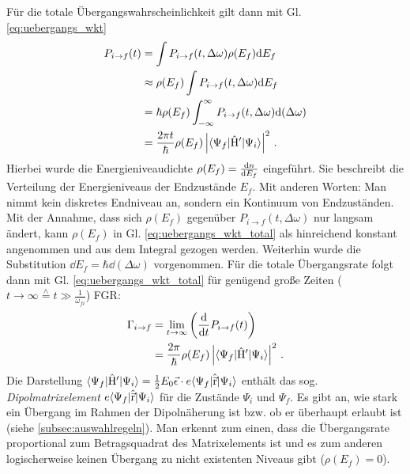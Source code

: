 Für die totale Übergangswahrscheinlichkeit gilt dann mit Gl.
\eqref{eq:uebergangs_wkt}
\begin{equation}\label{eq:uebergangs_wkt_total}
	\begin{split}
		P_{i\to f}(t)
		&= \int{P_{i\to f}(t,\Delta\omega)\rho(E_f)}\mathrm{d} E_f\\
		&\approx \rho(E_f)\int{P_{i\to f}(t,\Delta\omega)}\mathrm{d} E_f\\
		&= \hbar\rho(E_f)\int_{-\infty}^{\infty}{P_{i\to
		f}(t,\Delta\omega)}\mathrm{d}(\Delta\omega)\\
		&= \frac{2\pi t}{\hbar}\rho(E_f)\left|\langle{\Psi_f}|\hat{\mathrm{H}}'|{\Psi_i}\rangle\right|^2\,.
	\end{split}
\end{equation}
Hierbei wurde die Energieniveaudichte $\rho(E_f)=\frac{\mathrm{d} n}{\mathrm{d} E_f}$ eingeführt. Sie
beschreibt die Verteilung der Energieniveaus der Endzustände $E_f$. Mit anderen
Worten: Man nimmt kein diskretes Endniveau an, sondern ein Kontinuum
von Endzuständen. Mit der Annahme, dass sich $\rho(E_f)$ gegenüber $P_{i\to
f}(t,\Delta\omega)$ nur langsam ändert, kann $\rho(E_f)$ in Gl. \eqref{eq:uebergangs_wkt_total} als hinreichend konstant angenommen und aus dem Integral gezogen werden. Weiterhin wurde die Substitution $\dd E_f=\hbar\dd(\Delta\omega)$ vorgenommen. Für die
totale Übergangsrate folgt dann mit Gl. \eqref{eq:uebergangs_wkt_total}
für genügend große Zeiten ($t\to\infty\stackrel{\wedge}{=}
t\gg\frac{1}{\omega_{fi}}$) FGR:
\begin{equation}\label{eq:uebergangs_rate_total}
	\begin{split}
		\Gamma_{i\to f}
		&= \lim_{t\to\infty}{\left(\frac{\mathrm{d} }{\mathrm{d} t}{P_{i\to f}(t)}\right)}\\
		&= \frac{2\pi}{\hbar}\rho(E_f)\left|\langle{\Psi_f}|\hat{\mathrm{H}}'|{\Psi_i}\rangle\right|^2\,.
	\end{split}
\end{equation}
Die Darstellung $\langle{\Psi_f}|\hat{\mathrm{H}}'|{\Psi_i}\rangle =
\frac{1}{2}E_0\vec{\epsilon}\cdot e\langle{\Psi_f}|\hat{\vec{\mathrm{r}}}|{\Psi_i}\rangle$ enthält
das sog. \textit{Dipolmatrixelement} $e\langle{\Psi_f}|\hat{\vec{\mathrm{r}}}|{\Psi_i}\rangle$ für die Zustände
$\Psi_i$ und $\Psi_f$. Es gibt an, wie stark ein Übergang im Rahmen der
Dipolnäherung ist bzw. ob er überhaupt erlaubt ist (siehe
\ref{subsec:auswahlregeln}). Man erkennt zum einen, dass die Übergangsrate proportional zum
Betragsquadrat des Matrixelements ist und es zum anderen logischerweise keinen
Übergang zu nicht existenten Niveaus gibt ($\rho(E_f)=0$). 

